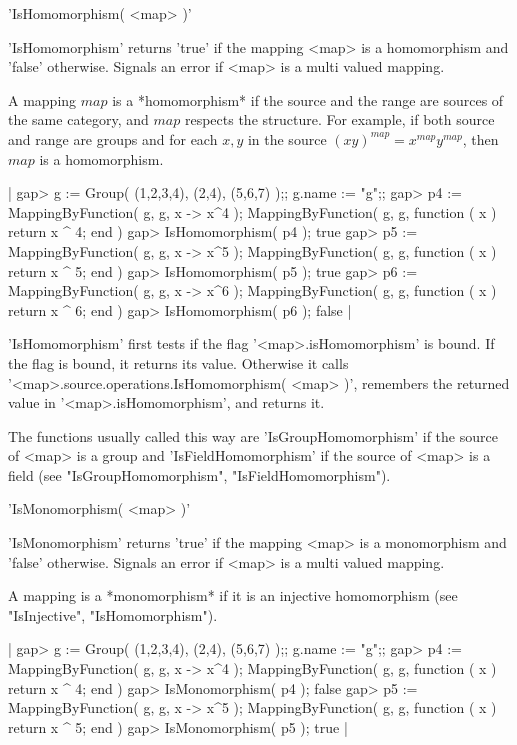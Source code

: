 
'IsHomomorphism( <map> )'

'IsHomomorphism'  returns 'true'  if the mapping <map> is  a homomorphism
and 'false' otherwise.  Signals  an  error  if <map>  is  a  multi valued
mapping.

A mapping  $map$  is a *homomorphism*  if the  source and  the  range are
sources of  the  same category, and  $map$ respects the  structure.   For
example,  if both  source and range are groups  and for each $x,y$ in the
source $(xy)^{map} = x^{map} y^{map}$, then $map$ is a homomorphism.

|    gap> g := Group( (1,2,3,4), (2,4), (5,6,7) );;  g.name := "g";;
    gap> p4 := MappingByFunction( g, g, x -> x^4 );
    MappingByFunction( g, g, function ( x )
        return x ^ 4;
    end )
    gap> IsHomomorphism( p4 );
    true
    gap> p5 := MappingByFunction( g, g, x -> x^5 );
    MappingByFunction( g, g, function ( x )
        return x ^ 5;
    end )
    gap> IsHomomorphism( p5 );
    true
    gap> p6 := MappingByFunction( g, g, x -> x^6 );
    MappingByFunction( g, g, function ( x )
        return x ^ 6;
    end )
    gap> IsHomomorphism( p6 );
    false |

'IsHomomorphism' first tests if the flag '<map>.isHomomorphism' is bound.
If  the flag  is  bound,  it  returns  its  value.   Otherwise  it  calls
'<map>.source.operations.IsHomomorphism( <map> )', remembers the returned
value in '<map>.isHomomorphism', and returns it.

The functions  usually called this  way  are 'IsGroupHomomorphism' if the
source  of <map> is a group  and  'IsFieldHomomorphism'  if the source of
<map> is a field (see "IsGroupHomomorphism", "IsFieldHomomorphism").


'IsMonomorphism( <map> )'

'IsMonomorphism' returns 'true' if the  mapping  <map> is a  monomorphism
and 'false'  otherwise.  Signals  an  error  if <map> is  a  multi valued
mapping.

A mapping  is  a *monomorphism*  if it is an  injective homomorphism (see
"IsInjective", "IsHomomorphism").

|    gap> g := Group( (1,2,3,4), (2,4), (5,6,7) );;  g.name := "g";;
    gap> p4 := MappingByFunction( g, g, x -> x^4 );
    MappingByFunction( g, g, function ( x )
        return x ^ 4;
    end )
    gap> IsMonomorphism( p4 );
    false
    gap> p5 := MappingByFunction( g, g, x -> x^5 );
    MappingByFunction( g, g, function ( x )
        return x ^ 5;
    end )
    gap> IsMonomorphism( p5 );
    true |

